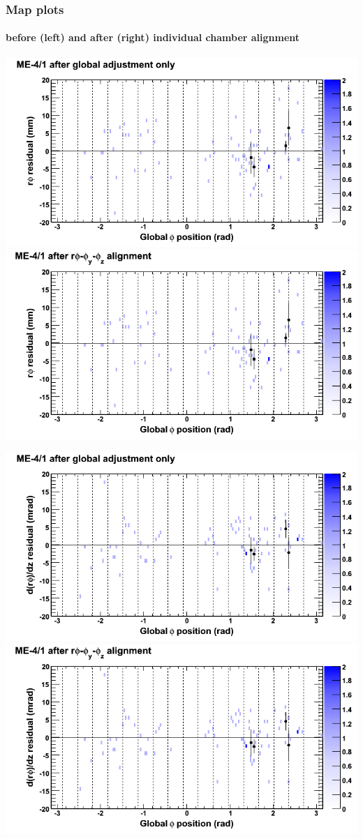 \documentclass[compress]{beamer}
\begin{document}
\begin{frame}
\frametitle{Map plots}
\framesubtitle{before (left) and after (right) individual chamber alignment}
\includegraphics[width=0.5\linewidth]{ringmapplots_3dof/before_CSCvsphi_mem41_x.png} \includegraphics[width=0.5\linewidth]{ringmapplots_3dof/after_CSCvsphi_mem41_x.png}

\includegraphics[width=0.5\linewidth]{ringmapplots_3dof/before_CSCvsphi_mem41_dxdz.png} \includegraphics[width=0.5\linewidth]{ringmapplots_3dof/after_CSCvsphi_mem41_dxdz.png}
\end{frame}
\end{document}
